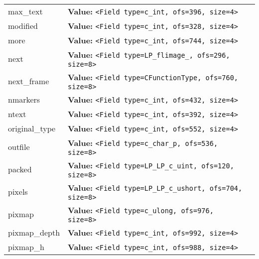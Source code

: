 \begin{longtable}{|p{\varnamewidth}|p{\vardescrwidth}|l}
\cline{1-2}
\raggedright m\-a\-x\-\_\-t\-e\-x\-t\- & \raggedright \textbf{Value:} 
{\tt {\textless}Field type=c\_int, ofs=396, size=4{\textgreater}}&\\
\cline{1-2}
\raggedright m\-o\-d\-i\-f\-i\-e\-d\- & \raggedright \textbf{Value:} 
{\tt {\textless}Field type=c\_int, ofs=328, size=4{\textgreater}}&\\
\cline{1-2}
\raggedright m\-o\-r\-e\- & \raggedright \textbf{Value:} 
{\tt {\textless}Field type=c\_int, ofs=744, size=4{\textgreater}}&\\
\cline{1-2}
\raggedright n\-e\-x\-t\- & \raggedright \textbf{Value:} 
{\tt {\textless}Field type=LP\_flimage\_, ofs=296, size=8{\textgreater}}&\\
\cline{1-2}
\raggedright n\-e\-x\-t\-\_\-f\-r\-a\-m\-e\- & \raggedright \textbf{Value:} 
{\tt {\textless}Field type=CFunctionType, ofs=760, size=8{\textgreater}}&\\
\cline{1-2}
\raggedright n\-m\-a\-r\-k\-e\-r\-s\- & \raggedright \textbf{Value:} 
{\tt {\textless}Field type=c\_int, ofs=432, size=4{\textgreater}}&\\
\cline{1-2}
\raggedright n\-t\-e\-x\-t\- & \raggedright \textbf{Value:} 
{\tt {\textless}Field type=c\_int, ofs=392, size=4{\textgreater}}&\\
\cline{1-2}
\raggedright o\-r\-i\-g\-i\-n\-a\-l\-\_\-t\-y\-p\-e\- & \raggedright \textbf{Value:} 
{\tt {\textless}Field type=c\_int, ofs=552, size=4{\textgreater}}&\\
\cline{1-2}
\raggedright o\-u\-t\-f\-i\-l\-e\- & \raggedright \textbf{Value:} 
{\tt {\textless}Field type=c\_char\_p, ofs=536, size=8{\textgreater}}&\\
\cline{1-2}
\raggedright p\-a\-c\-k\-e\-d\- & \raggedright \textbf{Value:} 
{\tt {\textless}Field type=LP\_LP\_c\_uint, ofs=120, size=8{\textgreater}}&\\
\cline{1-2}
\raggedright p\-i\-x\-e\-l\-s\- & \raggedright \textbf{Value:} 
{\tt {\textless}Field type=LP\_LP\_c\_ushort, ofs=704, size=8{\textgreater}}&\\
\cline{1-2}
\raggedright p\-i\-x\-m\-a\-p\- & \raggedright \textbf{Value:} 
{\tt {\textless}Field type=c\_ulong, ofs=976, size=8{\textgreater}}&\\
\cline{1-2}
\raggedright p\-i\-x\-m\-a\-p\-\_\-d\-e\-p\-t\-h\- & \raggedright \textbf{Value:} 
{\tt {\textless}Field type=c\_int, ofs=992, size=4{\textgreater}}&\\
\cline{1-2}
\raggedright p\-i\-x\-m\-a\-p\-\_\-h\- & \raggedright \textbf{Value:} 
{\tt {\textless}Field type=c\_int, ofs=988, size=4{\textgreater}}&\\

\end{longtable}
